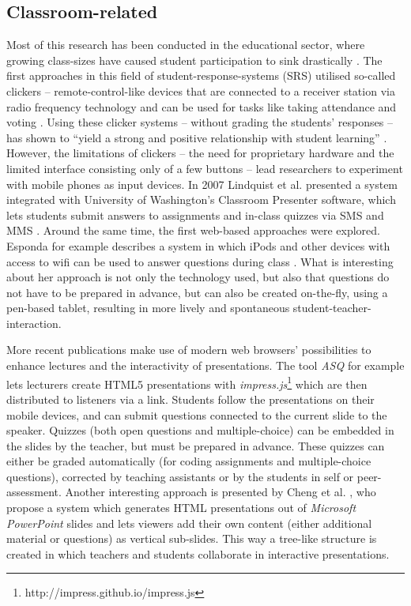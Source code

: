 \subsection{Classroom-related}
Most of this research has been conducted in the educational sector, where growing class-sizes have caused student participation to sink drastically \cite{Bry:Backstage}. The first ap\-proa\-ches in this field of student-response-systems (SRS) utilised so-called clickers -- remote-control-like devices that are connected to a receiver station via radio frequency technology \cite{cuclickers:faq} and can be used for tasks like taking attendance and voting \cite{Chamillard:StudentResponseSystem}. Using these clicker systems -- without grading the students' responses -- has shown to ``yield a strong and positive relationship with student learning'' \cite{Chamillard:StudentResponseSystem}. However, the limitations of clickers -- the need for proprietary hardware and the limited interface consisting only of a few buttons -- lead researchers to experiment with mobile phones as input devices. In 2007 Lindquist et al. presented a system integrated with University of Washington's Classroom Presenter software, which lets students submit answers to assignments and in-class quizzes via SMS and MMS \cite{Lindquist:ExploringMobilePhonesActiveLearning}. Around the same time, the first web-based approaches were explored. Esponda for example describes a system in which iPods and other devices with access to wifi can be used to answer questions during class \cite{Esponda:ElectronicVotingOnTheFly}. What is interesting about her approach is not only the technology used, but also that questions do not have to be prepared in advance, but can also be created on-the-fly, using a pen-based tablet, resulting in more lively and spontaneous student-teacher-interaction.

More recent publications make use of modern web brow\-sers' possibilities to enhance lectures and the interactivity of presentations. The tool \emph{ASQ} \cite{Triglianos:InteractiveWebPresentationsImpress} for example lets lecturers create HTML5 presentations with \emph{impress.js}\footnote{http://impress.github.io/impress.js} which are then distributed to listeners via a link. Students follow the presentations on their mobile devices, and can submit questions connected to the current slide to the speaker. Quizzes (both open questions and multiple-choice) can be embedded in the slides by the teacher, but must be prepared in advance. These quizzes can either be graded automatically (for coding assignments and multiple-choice questions), corrected by teaching assistants or by the students in self or peer-assessment. Another interesting approach is presented by Cheng et al. \cite{Cheng:TreebasedOnlinePresentations}, who propose a system which generates HTML presentations out of \emph{Microsoft PowerPoint} slides and lets viewers add their own content (either additional material or questions) as vertical sub-slides. This way a tree-like structure is created in which teachers and students collaborate in interactive presentations.

